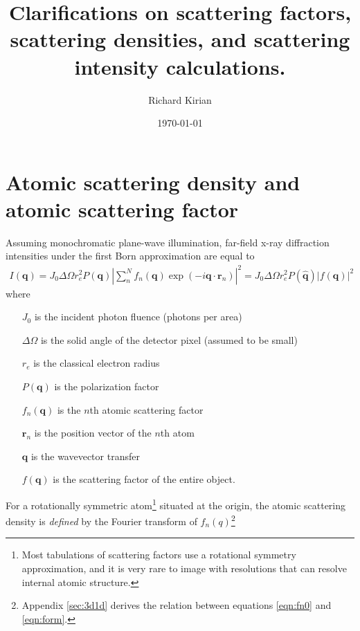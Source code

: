 \documentclass[11pt]{article}
\title{Clarifications on scattering factors, scattering densities, and scattering intensity calculations.}
\author{Richard Kirian}
\date{\today}
\renewcommand{\vec}[1]{\boldsymbol{#1}}
\newcommand{\hvec}[1]{\hat{\vec{#1}}}
\begin{document}
 

\maketitle


\section{Atomic scattering density and atomic scattering factor}

Assuming monochromatic plane-wave illumination, far-field x-ray diffraction intensities under the first Born
approximation are equal to
\begin{align}\label{eqn:qrf}
I(\vec{q}) = J_0 \Delta \Omega r_e^2 P(\vec{q}) \left| \sum_n^N f_n(\vec{q}) \exp(-i \vec{q}\cdot\vec{r}_n)\right|^2 = 
J_0 \Delta \Omega r_e^2 P(\hvec{q}) \left| f(\vec{q})\right|^2
\end{align}
where 
\begin{itemize}
\item[$J_0$] is the incident photon fluence (photons per area)
\item[$\Delta \Omega$] is the solid angle of the detector pixel (assumed
to be small)
\item[$r_e$] is the classical electron radius
\item[$P(\vec{q})$] is the polarization factor
\item[$f_n(\vec{q})$] is the $n$th atomic scattering factor
\item[$\vec{r}_n$] is the position vector of the $n$th atom
\item[$\vec{q}$] is the wavevector transfer
\item[$f(\vec{q})$] is the scattering factor of the entire object.
\end{itemize}
For a rotationally symmetric atom\footnote{Most tabulations of scattering factors use a rotational symmetry approximation, and it is very rare to image with resolutions that can resolve internal atomic structure.} situated at the origin, the atomic scattering density is \emph{defined}
by the Fourier transform of $f_n(q)$\footnote{Appendix \ref{sec:3d1d} derives the relation between equations \ref{eqn:fn0} and \ref{eqn:form}.}
\end{document}
